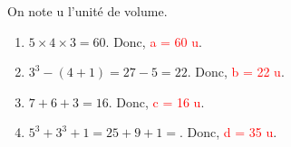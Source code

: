 \begin{corrige}
  On note u l'unité de volume. \\
  \begin{enumerate}
     \item $5\times4\times3 =60$. Donc, \textcolor{red}{a = 60 u}.
     \item $3^{3}-(4+1) =27-5 =22$. Donc, \textcolor{red}{b = 22 u}.
     \item $7+6+3 =16$. Donc, \textcolor{red}{c = 16 u}.
     \item $5^{3}+3^{3}+1 =25+9+1 =$. Donc, \textcolor{red}{d = 35 u}.
  \end{enumerate}
\end{corrige}

